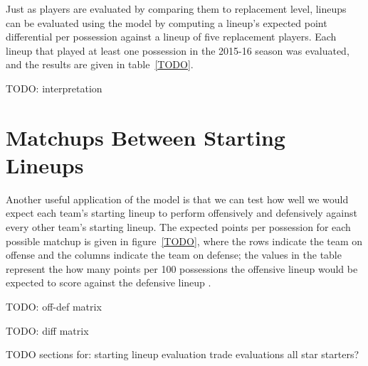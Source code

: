 Just as players are evaluated by comparing them to replacement level, lineups can be
evaluated using the model by computing a lineup's expected point differential per
possession against a lineup of five replacement players. Each lineup that played at
least one possession in the 2015-16 season was evaluated, and the results are given
in table~\ref{TODO}.

TODO: interpretation

\section{Matchups Between Starting Lineups}

Another useful application of the model is that we can test how well we would expect
each team's starting lineup to perform offensively and defensively against every
other team's starting lineup. The expected points per possession for each possible
matchup is given in figure~\ref{TODO}, where the rows indicate the team on offense
and the columns indicate the team on defense; the values in the table represent the
how many points per 100 possessions the offensive lineup would be expected to score
against the defensive lineup \citep{Knuth1968}.

TODO: off-def matrix


TODO: diff matrix


TODO sections for:
starting lineup evaluation
trade evaluations
all star starters?
